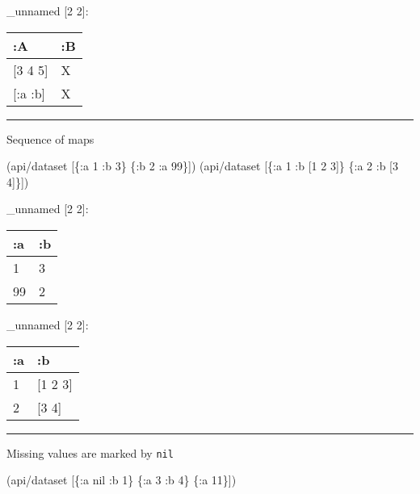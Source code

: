 \documentclass[]{article}
\newenvironment{Shaded}{\begin{snugshade}}{\end{snugshade}}
\newcommand{\AttributeTok}[1]{\textcolor[rgb]{0.77,0.63,0.00}{#1}}
\newcommand{\DecValTok}[1]{\textcolor[rgb]{0.00,0.00,0.81}{#1}}
\newcommand{\NormalTok}[1]{#1}
\newcommand{\VariableTok}[1]{\textcolor[rgb]{0.00,0.00,0.00}{#1}}
\begin{document}
\_unnamed {[}2 2{]}:

\begin{longtable}[]{@{}ll@{}}
\toprule
:A & :B\tabularnewline
\midrule
\endhead
{[}3 4 5{]} & X\tabularnewline
{[}:a :b{]} & X\tabularnewline
\bottomrule
\end{longtable}

\begin{center}\rule{0.5\linewidth}{0.5pt}\end{center}

Sequence of maps

\begin{Shaded}
\begin{Highlighting}[]
\NormalTok{(api/dataset [\{}\AttributeTok{:a} \DecValTok{1} \AttributeTok{:b} \DecValTok{3}\NormalTok{\} \{}\AttributeTok{:b} \DecValTok{2} \AttributeTok{:a} \DecValTok{99}\NormalTok{\}])}
\NormalTok{(api/dataset [\{}\AttributeTok{:a} \DecValTok{1} \AttributeTok{:b}\NormalTok{ [}\DecValTok{1} \DecValTok{2} \DecValTok{3}\NormalTok{]\} \{}\AttributeTok{:a} \DecValTok{2} \AttributeTok{:b}\NormalTok{ [}\DecValTok{3} \DecValTok{4}\NormalTok{]\}])}
\end{Highlighting}
\end{Shaded}

\_unnamed {[}2 2{]}:

\begin{longtable}[]{@{}ll@{}}
\toprule
:a & :b\tabularnewline
\midrule
\endhead
1 & 3\tabularnewline
99 & 2\tabularnewline
\bottomrule
\end{longtable}

\_unnamed {[}2 2{]}:

\begin{longtable}[]{@{}ll@{}}
\toprule
:a & :b\tabularnewline
\midrule
\endhead
1 & {[}1 2 3{]}\tabularnewline
2 & {[}3 4{]}\tabularnewline
\bottomrule
\end{longtable}

\begin{center}\rule{0.5\linewidth}{0.5pt}\end{center}

Missing values are marked by \texttt{nil}

\begin{Shaded}
\begin{Highlighting}[]
\NormalTok{(api/dataset [\{}\AttributeTok{:a} \VariableTok{nil} \AttributeTok{:b} \DecValTok{1}\NormalTok{\} \{}\AttributeTok{:a} \DecValTok{3} \AttributeTok{:b} \DecValTok{4}\NormalTok{\} \{}\AttributeTok{:a} \DecValTok{11}\NormalTok{\}])}
\end{Highlighting}
\end{Shaded}
\end{document}
